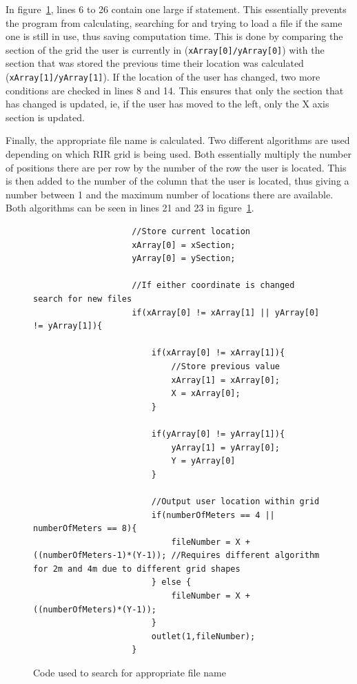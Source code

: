 \documentclass[../../main.tex]{subfiles}
\begin{document}

					In figure~\ref{jsFile}, lines 6 to 26 contain one large if statement. This essentially prevents the program from calculating, searching for and trying to load a file if the same one is still in use, thus saving computation time. This is done by comparing the section of the grid the user is currently in  (\texttt{xArray[0]/yArray[0]}) with the section that was stored the previous time their location was calculated  (\texttt{xArray[1]/yArray[1]}). If the location of the user has changed, two more conditions are checked in lines 8 and 14. This ensures that only the section that has changed is updated, ie, if the user has moved to the left, only the X axis section is updated.

					Finally, the appropriate file name is calculated. Two different algorithms are used depending on which \ac{RIR} grid is being used. Both essentially multiply the number of positions there are per row by the number of the row the user is located. This is then added to the number of the column that the user is located, thus giving a number between 1 and the maximum number of locations there are available. Both algorithms can be seen in lines 21 and 23 in figure~\ref{jsFile}.


				
					\begin{figure}[H]
					\begin{lstlisting}
					//Store current location
					xArray[0] = xSection;
					yArray[0] = ySection;

					//If either coordinate is changed search for new files
					if(xArray[0] != xArray[1] || yArray[0] != yArray[1]){
						
						if(xArray[0] != xArray[1]){
							//Store previous value
							xArray[1] = xArray[0];
							X = xArray[0];
						}
						
						if(yArray[0] != yArray[1]){
							yArray[1] = yArray[0];
							Y = yArray[0]
						}
						
						//Output user location within grid
						if(numberOfMeters == 4 || numberOfMeters == 8){
							fileNumber = X + ((numberOfMeters-1)*(Y-1)); //Requires different algorithm for 2m and 4m due to different grid shapes
						} else {
							fileNumber = X + ((numberOfMeters)*(Y-1));
						}	
						outlet(1,fileNumber);
					}
					\end{lstlisting}
					\caption{Code used to search for appropriate file name}
					\label{jsFile}
					\end{figure}
		
\end{document}
